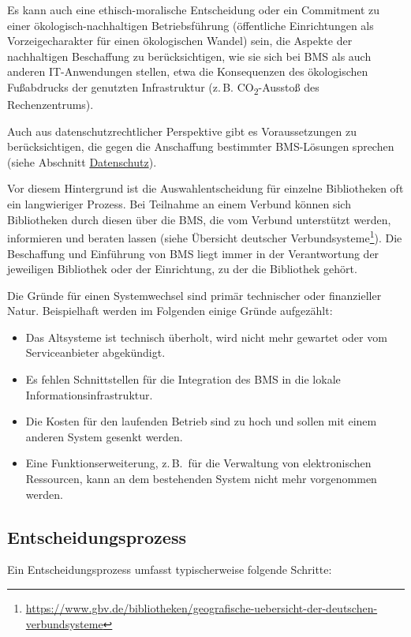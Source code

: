 \documentclass[
  11pt,
  letterpaper,
  DIV=11,
  twoside]{scrreprt}
\DeclareRobustCommand{\href}[2]{#2\footnote{\url{#1}}}
\begin{document}
Es kann auch eine ethisch-moralische Entscheidung oder ein Commitment zu
einer ökologisch-nachhaltigen Betriebsführung (öffentliche Einrichtungen
als Vorzeigecharakter für einen ökologischen Wandel) sein, die Aspekte
der nachhaltigen Beschaffung zu berücksichtigen, wie sie sich bei BMS
als auch anderen IT-Anwendungen stellen, etwa die Konsequenzen des
ökologischen Fußabdrucks der genutzten Infrastruktur (z.\,B.
CO\textsubscript{2}-Ausstoß des Rechenzentrums).

Auch aus datenschutzrechtlicher Perspektive gibt es Voraussetzungen zu
berücksichtigen, die gegen die Anschaffung bestimmter BMS-Lösungen
sprechen (siehe Abschnitt \hyperref[datenschutz-etc]{Datenschutz}).

Vor diesem Hintergrund ist die Auswahlentscheidung für einzelne
Bibliotheken oft ein langwieriger Prozess. Bei Teilnahme an einem
Verbund können sich Bibliotheken durch diesen über die BMS, die vom
Verbund unterstützt werden, informieren und beraten lassen (siehe
\href{https://www.gbv.de/bibliotheken/geografische-uebersicht-der-deutschen-verbundsysteme}{Übersicht
deutscher Verbundsysteme}). Die Beschaffung und Einführung von BMS liegt
immer in der Verantwortung der jeweiligen Bibliothek oder der
Einrichtung, zu der die Bibliothek gehört.

Die Gründe für einen Systemwechsel sind primär technischer oder
finanzieller Natur. Beispielhaft werden im Folgenden einige Gründe
aufgezählt:

\begin{itemize}
\item
  Das Altsysteme ist technisch überholt, wird nicht mehr gewartet oder
  vom Serviceanbieter abgekündigt.
\item
  Es fehlen Schnittstellen für die Integration des BMS in die lokale
  Informationsinfrastruktur.
\item
  Die Kosten für den laufenden Betrieb sind zu hoch und sollen mit einem
  anderen System gesenkt werden.
\item
  Eine Funktionserweiterung, z.\,B.~für die Verwaltung von
  elektronischen Ressourcen, kann an dem bestehenden System nicht mehr
  vorgenommen werden.
\end{itemize}

\subsection{Entscheidungsprozess}\label{entscheidungsprozess}

Ein Entscheidungsprozess umfasst typischerweise folgende Schritte:
\end{document}
